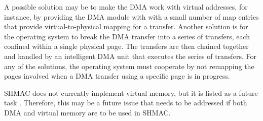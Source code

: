 A possible solution may be to make the DMA work with virtual addresses, for instance, by providing the DMA module with with a small number of map entries that provide virtual-to-physical mapping for a transfer.
Another solution is for the operating system to break the DMA transfer into a series of transfers, each confined within a single physical page.
The transfers are then chained together and handled by an intelligent DMA unit that executes the series of transfers. 
For any of the solutions, the operating system must cooperate by not remapping the pages involved when a DMA transfer using a specific page is in progress.

SHMAC does not currently implement virtual memory, but it is listed as a future task \cite{shmac-plan}.
Therefore, this may be a future issue that needs to be addressed if both DMA and virtual memory are to be used in SHMAC. 

